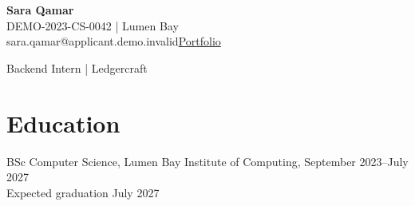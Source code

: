 
{\LARGE\textbf{Sara Qamar}}\\
DEMO-2023-CS-0042 | Lumen Bay\\
sara.qamar@applicant.demo.invalid\quad \href{https://portfolio.demo.invalid/sara-qamar}{Portfolio}
\par\small{Backend Intern | Ledgercraft}\par
\section{Education}
BSc Computer Science, Lumen Bay Institute of Computing, September 2023–July 2027\\
Expected graduation July 2027
